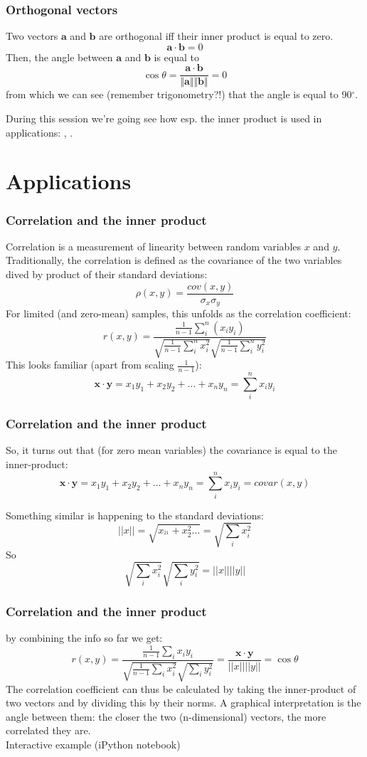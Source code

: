 \documentclass{beamer}
\begin{document}
\begin{frame}
\frametitle{Orthogonal vectors}
Two vectors $\mathbf{a}$ and $\mathbf{b}$ are orthogonal iff their inner product is equal to zero.
$$\mathbf{a} \cdot  \mathbf{b} = 0 $$
Then, the angle between $\mathbf{a}$ and $\mathbf{b}$ is equal to
$$ \cos\theta =\frac{\mathbf{a} \cdot \mathbf{b}}{\Vert \mathbf{a}\Vert  \Vert \mathbf{b} \Vert} = 0$$ from which we can see (remember trigonometry?!) that the angle is equal to 90$^{\circ}$. 

During this session we're going see how esp. the inner product is used in applications: {}  ,  {}.
\end{frame}

\section{Applications}
\begin{frame}
\frametitle{Correlation and the inner product}
Correlation is a measurement of linearity between random variables $x$ and $y$.
Traditionally, the correlation is defined as the covariance of the two variables dived by product of their standard deviations:
$$\rho(x,y) = \frac{cov(x,y)}{\sigma_x\sigma_y}$$
For limited (and zero-mean) samples, this unfolds as the correlation coefficient:
$$r(x,y) = \frac{ \frac{1}{n-1} \sum_i^n (x_i y_i)}
{\sqrt{\frac{1}{n-1}\sum_i^n x_i^2 } \sqrt{\frac{1}{n-1}\sum_i^n y_i^2}}$$
This looks familiar (apart from scaling $\frac{1}{n-1}$):
$$\mathbf{x} \cdot  \mathbf{y} = x_1 y_1 + x_2 y_2 + \ldots +  x_n y_n = \sum_i^n x_i y_i$$
\end{frame}

\begin{frame}
\frametitle{Correlation and the inner product}
So, it turns out that (for zero mean variables) the covariance is equal to the inner-product:
$$\mathbf{x} \cdot  \mathbf{y} = x_1 y_1 + x_2 y_2 + \ldots + x_n y_n= \sum_i^n x_i y_i = covar(x,y)$$

Something similar is happening to the standard deviations:
$$||x|| = \sqrt{x_^21 + x_2^2 \ldots} = \sqrt{\sum_i x_i^2}$$
So 
$$\sqrt{\sum_ix_i^2} \sqrt{\sum_iy_i^2} = ||x|| ||y||$$
\end{frame}


\begin{frame}
\frametitle{Correlation and the inner product}
by  combining the info so far we get:
$$r(x,y) = \frac{ \frac{1}{n-1}\sum_i x_i y_i}
{\sqrt{\frac{1}{n-1}\sum_i x_i^2} \sqrt{\sum_i y_i^2}} = \frac{\mathbf{x} \cdot  \mathbf{y} } {||x|| ||y||} = \cos{\theta}$$
The correlation coefficient can thus be calculated by taking the inner-product of two vectors and by dividing this by their norms. A graphical interpretation is the angle between them: the closer the two (n-dimensional) vectors, the more correlated they are.\\
Interactive example (iPython notebook)
\end{frame}
\end{document}
